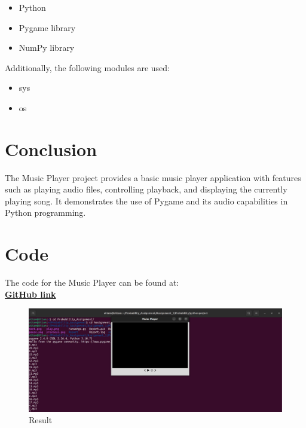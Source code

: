 \documentclass[journal,12pt,twocolumn]{IEEEtran}
\begin{document}
\begin{itemize}
\item Python 
\item Pygame library
\item NumPy library
\end{itemize}

Additionally, the following modules are used:

\begin{itemize}
        \item sys
        \item os
\end{itemize}

\section{Conclusion}
The Music Player project provides a basic music player application with features such as playing audio files, controlling playback, and displaying the currently playing song. It demonstrates the use of Pygame and its audio capabilities in Python programming.

\section{Code}
The code for the Music Player can be found at:\\
\textcolor{blue}{\href{https://github.com/Uttam-Paharia/Probability/tree/main/pythonproject}{\textbf{GitHub link}}}
\begin{figure}[h]
        \includegraphics[width=\linewidth]
{project.png}
        \caption{Result}
\end{figure}
\end{document}
